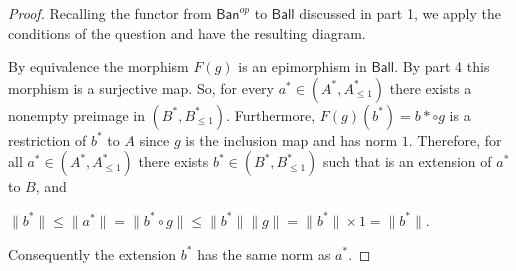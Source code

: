 \documentclass{article}
\begin{document}
\begin{proof}
	
	Recalling the functor from $\textsf{Ban}^{op}$ to $\textsf{Ball}$ discussed in part 1, we apply the conditions of the question and have the resulting diagram.
	
	\begin{center}
	\end{center}
	
	By equivalence the morphism $F(g)$ is an epimorphism in $\textsf{Ball}$.
	By part 4 this morphism is a surjective map.
	So, for every $a^* \in (A^*,A^*_{\leq1})$ there exists a nonempty preimage in $(B^*,B^*_{\leq1})$.
	Furthermore, $F(g)(b^*)=b*\circ{g}$ is a restriction of $b^*$ to $A$ since $g$ is the inclusion map and has norm $1$.
	Therefore, for all $a^*\in (A^*,A^*_{\leq1})$ there exists $b^*\in (B^*,B^*_{\leq1})$ such that is an extension of $a^*$ to $B$, and
	\begin{center}
		$\|b^*\|\leq\|a^*\|=\|b^*\circ{g}\|\leq \|b^*\|\|g\|=\|b^*\|\times 1=\|b^*\|$.
	\end{center}
	Consequently the extension $b^*$ has the same norm as $a^*$.
	
\end{proof}
\end{document}
